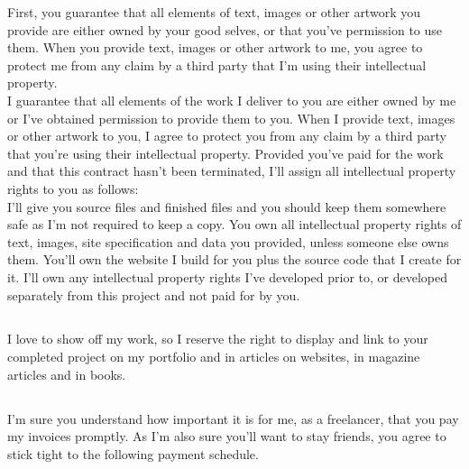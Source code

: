 \documentclass[10px,a4paper]{article}
\begin{document}
First, you guarantee that all elements of text, images or other artwork you provide are either owned by your good selves, or that you've permission to use them.
When you provide text, images or other artwork to me, you agree to protect me from any claim by a third party that I'm using their intellectual property.\\

I guarantee that all elements of the work I deliver to you are either owned by me or I've obtained permission to provide them to you.
When I provide text, images or other artwork to you, I agree to protect you from any claim by a third party that you're using their intellectual property.
Provided you've paid for the work and that this contract hasn't been terminated, I'll assign all intellectual property rights to you as follows:\\

I'll give you source files and finished files and you should keep them somewhere safe as I'm not required to keep a copy.
You own all intellectual property rights of text, images, site specification and data you provided, unless someone else owns them.
You'll own the website I build for you plus the source code that I create for it.
I'll own any intellectual property rights I've developed prior to, or developed separately from this project and not paid for by you.

\begin{displayingMyWork}
\subsection*{}

I love to show off my work, so I reserve the right to display and link to your completed project
on my portfolio and in articles on websites, in magazine articles and in books.
\end{displayingMyWork}

\subsection*{}

I'm sure you understand how important it is for me, as a freelancer, that you pay my invoices promptly.
As I'm also sure you'll want to stay friends, you agree to stick tight to the following payment schedule.

\subsubsection*{}
\end{document}
